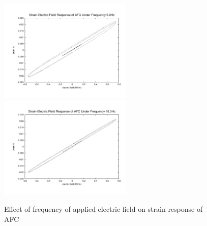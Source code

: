 \begin{figure}
{\includegraphics[width=2.5in]{./chap_4_structural_analyses/afc_unit_cell/frequency_effect/electric_field_vs_strains_freq_5p0}}
{\includegraphics[width=2.5in]{./chap_4_structural_analyses/afc_unit_cell/frequency_effect/electric_field_vs_strains_freq_10p0}}
\caption{Effect of frequency of applied electric field on strain response of AFC}
\label{fig:afc_Frequency_Effect}
\end{figure}
 



\clearpage